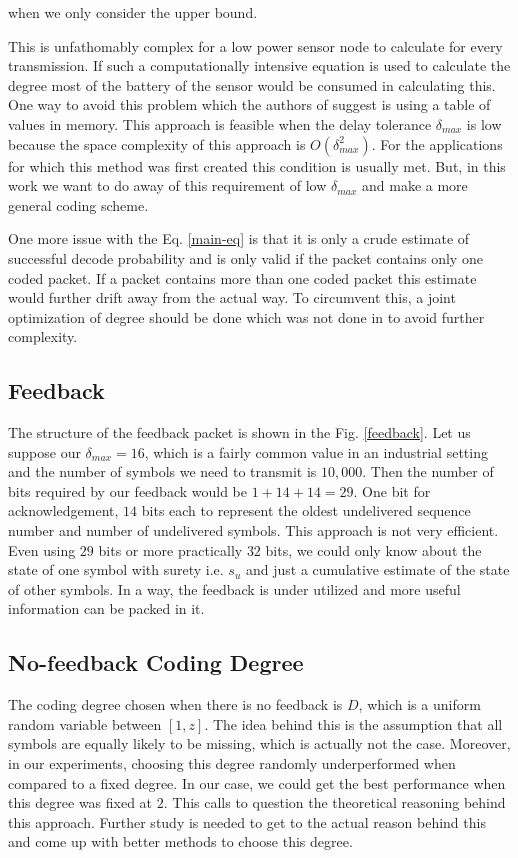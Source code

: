 when we only consider the upper bound.

This is unfathomably complex for a low power sensor node to calculate for every transmission. If such a computationally intensive equation is used to calculate the degree most of the battery of the sensor would be consumed in calculating this. One way to avoid this problem which the authors of \cite{borkotokyicc} suggest is using a table of values in memory. This approach is feasible when the delay tolerance $\delta_{max}$ is low because the space complexity of this approach is $O\left(\delta_{max}^2\right)$. For the applications for which this method was first created this condition is usually met. But, in this work we want to do away of this requirement of low $\delta_{max}$ and make a more general coding scheme.

One more issue with the Eq. \ref{main-eq} is that it is only a crude estimate of successful decode probability and is only valid if the packet contains only one coded packet. If a packet contains more than one coded packet this estimate would further drift away from the actual way. To circumvent this, a joint optimization of degree should be done which was not done in \cite{borkotokyicc} to avoid further complexity.


\subsection{Feedback}
The structure of the feedback packet is shown in the Fig. \ref{feedback}. Let us suppose our $\delta_{max} = 16$, which is a fairly common value in an industrial setting and the number of symbols we need to transmit is $10,000$. Then the number of bits required by our feedback would be $1 + 14 + 14 = 29$. One bit for acknowledgement, $14$ bits each to represent the oldest undelivered sequence number and number of undelivered symbols. This approach is not very efficient. Even using $29$ bits or more practically $32$ bits, we could only know about the state of one symbol with surety i.e. $s_u$ and just a cumulative estimate of the state of other symbols. In a way, the feedback is under utilized and more useful information can be packed in it.

\subsection{No-feedback Coding Degree}
The coding degree chosen when there is no feedback is $D$, which is a uniform random variable between $[1, z]$. The idea behind this is the assumption that all symbols are equally likely to be missing, which is actually not the case. Moreover, in our experiments, choosing this degree randomly underperformed when compared to a fixed degree. In our case, we could get the best performance when this degree was fixed at $2$. This calls to question the theoretical reasoning behind this approach. Further study is needed to get to the actual reason behind this and come up with better methods to choose this degree.

